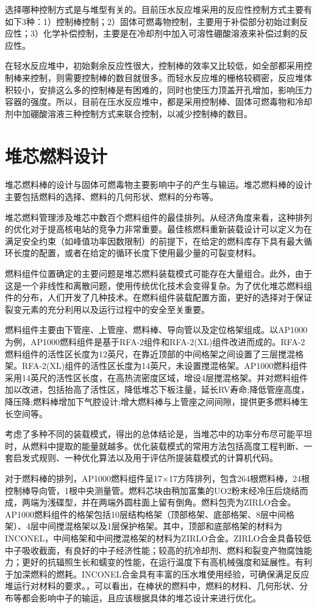 \documentclass{article}
\begin{document}
选择哪种控制方式是与堆型有关的。目前压水反应堆采用的反应性控制方式主要有如下3种：1）控制棒控制；2）固体可燃毒物控制，主要用于补偿部分初始过剩反应性；3）化学补偿控制，主要是在冷却剂中加入可溶性硼酸溶液来补偿过剩的反应性。

在轻水反应堆中，初始剩余反应性很大，控制棒的效率又比较低，如全部都采用控制棒来控制，则需要控制棒的数目就很多。而轻水反应堆的栅格较稠密，反应堆体积较小，安排这么多的控制棒是有困难的，同时也使压力顶盖开孔增加，影响压力容器的强度。所以，目前在压水反应堆中，都是采用控制棒、固体可燃毒物和冷却剂中加硼酸溶液三种控制方式来联合控制，以减少控制棒的数目。

\section{堆芯燃料设计}
堆芯燃料棒的设计与固体可燃毒物主要影响中子的产生与输运。堆芯燃料棒的设计主要包括燃料的选择、燃料的几何形状、燃料的分布等。

堆芯燃料管理涉及堆芯中数百个燃料组件的最佳排列。从经济角度来看，这种排列的优化对于提高核电站的竞争力非常重要。最佳核燃料重新装载设计可以定义为在满足安全约束（如峰值功率因数限制）的前提下，在给定的燃料库存下具有最大循环长度的配置，或者在给定的循环长度下使用最少量的可裂变材料。

燃料组件位置确定的主要问题是堆芯燃料装载模式可能存在大量组合。此外，由于这是一个非线性和离散问题，使用传统优化技术会变得复杂。为了优化堆芯燃料组件的分布，人们开发了几种技术。在燃料组件装载配置方面，更好的选择对于保证裂变元素的充分利用以及运行过程中的安全至关重要。

燃料组件主要由下管座、上管座、燃料棒、导向管以及定位格架组成。以AP1000为例，AP1000燃料组件是基于RFA-2组件和RFA-2(XL)组件改进而成的。RFA-2燃料组件的活性区长度为12英尺，在靠近顶部的中间格架之间设置了三层搅混格架。RFA-2(XL)组件的活性区长度为14英尺，未设置搅混格架。AP1000燃料组件采用14英尺的活性区长度，在高热流密度区域，增设4层搅混格架。并对燃料组件加以改进，包括抬高了活性区，降低堆芯下板注量，延长RV寿命;降低管座高度，降压降;燃料棒增加下气腔设计;增大燃料棒与上管座之间间隙，提供更多燃料棒生长空间等。\cite{HanXiangZhenDiSanDaiFanYingDuiAP1000HeEPRDeDuiXinHeSheJi2013}

考虑了多种不同的装载模式，得出的总体结论是，当堆芯中的功率分布尽可能平坦时，从燃料中提取的能量就越多。优化装载模式的常用方法包括高度工程判断、一套启发式规则、一种优化算法以及用于评估所提装载模式的计算机代码。

对于燃料棒的排列，AP1000燃料组件呈17×17方阵排列，包含264根燃料棒，24根控制棒导向管，1根中央测量管。燃料芯块由稍加富集的UO2粉末经冷压后烧结而成，两端为浅碟型，并在两端外圆柱面上留有倒角。燃料包壳为ZIRLO合金。AP1000燃料组件的格架包括10层结构格架（顶部格架、底部格架、8层中间格架）、4层中间搅混格架以及1层保护格架。其中，顶部和底部格架的材料为INCONEL，中间格架和中间搅混格架的材料为ZIRLO合金。ZIRLO合金具备较低中子吸收截面，有良好的中子经济性能；较高的抗冷却剂、燃料和裂变产物腐蚀能力；更好的抗辐照生长和蠕变的性能，在运行温度下有高机械强度和延展性。有利于加深燃料的燃耗。INCONEL合金具有丰富的压水堆使用经验，可确保满足反应堆运行对材料的要求。\cite{HanXiangZhenDiSanDaiFanYingDuiAP1000HeEPRDeDuiXinHeSheJi2013}，可以看出，在棒状的燃料中，燃料的材料、几何形状、分布等都会影响中子的输运，且应该根据具体的堆芯设计来进行优化。
\end{document}
